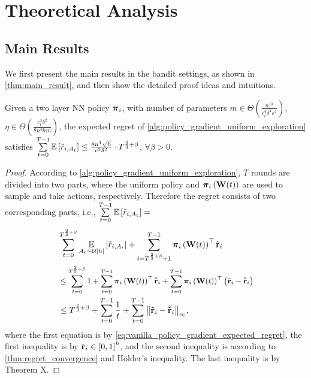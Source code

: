 \section{Theoretical Analysis}
\label{sec:theoretical_analysis}

\subsection{Main Results}
\label{subsec:main_results}

We first present the main results in the bandit settings, as shown in \cref{thm:main_result}, and then show the detailed proof ideas and  intuitions.

\begin{thm}
\label{thm:main_result}
    Given a two layer NN policy ${\boldsymbol{\pi}}_i$, with number of parameters $m \in \Theta\left( \frac{n^{10}}{c_t^4 \delta^4 \varepsilon^2} \right)$, $\eta \in \Theta\left( \frac{c_t^2 \delta^2}{8 n^4 h m} \right)$, the expected regret of \cref{alg:policy_gradient_uniform_exploration} satisfies $\sum\limits_{t=0}^{T-1}{ {\mathbb{E}} \left[ \tilde{r}_{i, A_t} \right] } \le  \frac{8 n^4 \sqrt{h}}{c^2 \delta^2} \cdot T^{\frac{2}{3} + \beta }$, $\forall \beta > 0$.
\end{thm}
\begin{proof}
According to \cref{alg:policy_gradient_uniform_exploration}, $T$ rounds are divided into two parts, where the uniform policy and ${\boldsymbol{\pi}}_i\left( {\mathbf{W}}(t) \right)$ are used to sample and take actions, respectively. Therefore the regret consists of two corresponding parts, i.e., $\sum\limits_{t=0}^{T-1}{ {\mathbb{E}} \left[ \tilde{r}_{i, A_t} \right] } =$
\begin{equation*}
\begin{split}
     &\sum\limits_{t=0}^{T^{\frac{2}{3} + \beta}}{ \expectation\limits_{A_t \sim \gU\left[h\right]}{ \left[ \tilde{r}_{i, A_t} \right] }} + \sum\limits_{t=T^{\frac{2}{3} + \beta} + 1}^{T-1}{ \rvpi_i\left( \rmW(t) \right)^\top \rvtilder_i } \\
     &\le \small{\sum\limits_{t=0}^{T^{\frac{2}{3} + \beta}}{ 1 } + \sum\limits_{t=0}^{T-1}{ \rvpi_i\left( \rmW(t) \right)^\top \hat{\rvtilder}_i } + \sum\limits_{t=0}^{T-1}{ \rvpi_i\left( \rmW(t) \right)^\top \left( \rvtilder_i -  \hat{\rvtilder}_i \right) } } \\
     &\le T^{\frac{2}{3} + \beta } + \sum\limits_{t=0}^{T-1}{ \frac{1}{t} } + \sum\limits_{t=0}^{T-1}{ \left\| \rvtilder_i -  \hat{\rvtilder}_i \right\|_\infty },
\end{split}
\end{equation*}
where the first equation is by \cref{eq:vanilla_policy_gradient_expected_regret}, the first inequality is by ${\tilde{\mathbf{r}}}_i \in \left[ 0, 1\right]^h$, and the second inequality is according to \cref{thm:regret_convergence} and H{\"o}lder's inequality. The last inequality is by Theorem X.
\end{proof}

